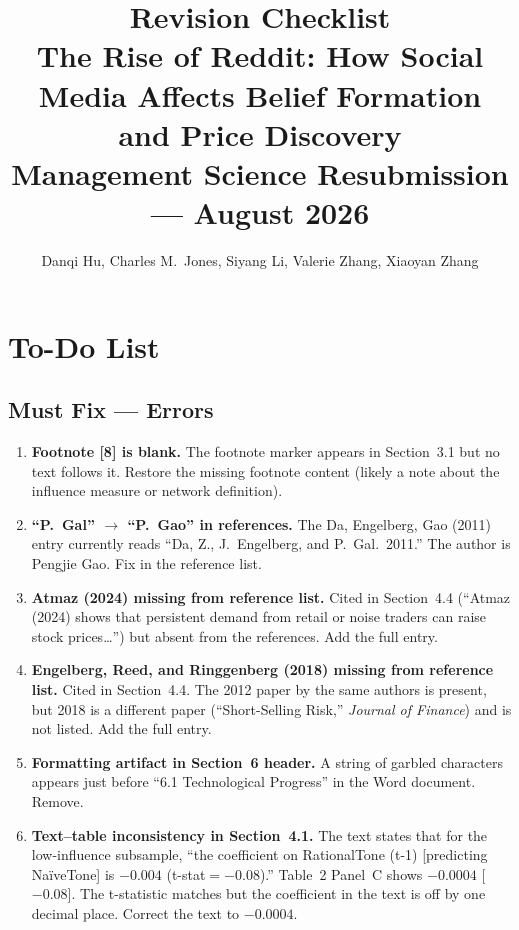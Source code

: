 \documentclass[11pt]{article}
\title{\textbf{Revision Checklist}\\
\large The Rise of Reddit: How Social Media Affects Belief Formation and Price Discovery\\[0.5em]
\normalsize Management Science Resubmission --- August 2026}
\author{Danqi Hu, Charles M.\ Jones, Siyang Li, Valerie Zhang, Xiaoyan Zhang}
\date{}
\newcommand{\fix}{\textcolor{fix}{$\square$}}
\begin{document}
\maketitle
\tableofcontents
\newpage

\section{To-Do List}

\subsection{Must Fix --- Errors}

\begin{enumerate}[leftmargin=*, label=\fix]

  \item \textbf{Footnote [8] is blank.} The footnote marker appears in
    Section~3.1 but no text follows it. Restore the missing footnote
    content (likely a note about the influence measure or network
    definition).

  \item \textbf{``P.\ Gal'' $\to$ ``P.\ Gao'' in references.} The
    Da, Engelberg, Gao (2011) entry currently reads ``Da, Z.,
    J.~Engelberg, and P.~Gal.\ 2011.'' The author is Pengjie Gao.
    Fix in the reference list.

  \item \textbf{Atmaz (2024) missing from reference list.} Cited in
    Section~4.4 (``Atmaz (2024) shows that persistent demand from
    retail or noise traders can raise stock prices\ldots'') but absent
    from the references. Add the full entry.

  \item \textbf{Engelberg, Reed, and Ringgenberg (2018) missing from
    reference list.} Cited in Section~4.4. The 2012 paper by the same
    authors is present, but 2018 is a different paper
    (``Short-Selling Risk,'' \textit{Journal of Finance}) and is not
    listed. Add the full entry.

  \item \textbf{Formatting artifact in Section~6 header.} A string of
    garbled characters appears just before ``6.1 Technological
    Progress'' in the Word document. Remove.

  \item \textbf{Text--table inconsistency in Section~4.1.} The text
    states that for the low-influence subsample, ``the coefficient on
    RationalTone (t-1) [predicting Na\"{i}veTone] is $-0.004$
    (t-stat$=-0.08$).'' Table~2 Panel~C shows $-0.0004$ [$-0.08$].
    The t-statistic matches but the coefficient in the text is off by
    one decimal place. Correct the text to $-0.0004$.


\end{enumerate}
\end{document}
